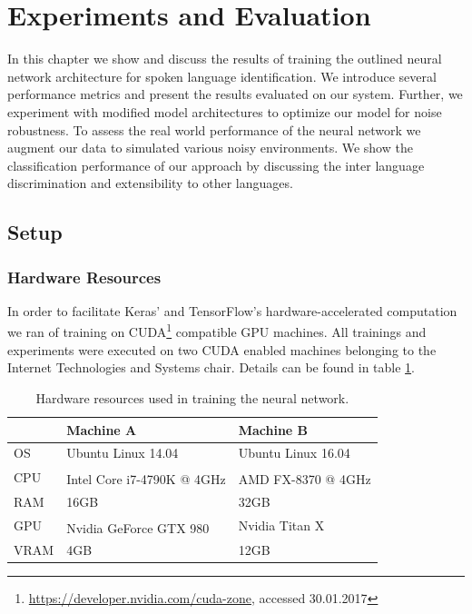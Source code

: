\section{Experiments and Evaluation} 
\label{sec:evaluation}
In this chapter we show and discuss the results of training the outlined neural network architecture for spoken language identification. We introduce several performance metrics and present the results evaluated on our system.
Further, we experiment with modified model architectures to optimize our model for noise robustness. To assess the real world performance of the neural network we augment our data to simulated various noisy environments. We show the classification performance of our approach by discussing the inter language discrimination and extensibility to other languages.     

\subsection{Setup} 
\label{sec:setup}

\subsubsection{Hardware Resources}
\label{sec:hardware}
	In order to facilitate Keras' and TensorFlow's hardware-accelerated computation we ran of training on CUDA\footnote{\url{https://developer.nvidia.com/cuda-zone}, accessed 30.01.2017} compatible GPU machines. All trainings and experiments were executed on two CUDA enabled machines belonging to the Internet Technologies and Systems chair. Details can be found in table \ref{tab:hardware}.
		
	\begin{table}[h]
	\centering
	\begin{tabularx}{\textwidth}{lll}
	\toprule
	  		& Machine A 					& Machine B \\ \midrule
	OS  	& Ubuntu Linux 14.04 		& Ubuntu Linux 16.04 \\
	CPU  	& Intel\textsuperscript{\textregistered} Core\textsuperscript{\texttrademark} i7-4790K @ 4GHz 	& AMD FX\textsuperscript{\texttrademark}-8370  @ 4GHz \\
	RAM  	& 16GB 						& 32GB \\
	GPU  	& Nvidia GeForce\textsuperscript{\textregistered} GTX 980 	& Nvidia Titan X \\
	VRAM  	& 4GB 						& 12GB \\
	\bottomrule
	\end{tabularx}
	\caption{Hardware resources used in training the neural network.}
	\label{tab:hardware}
	\end{table}

